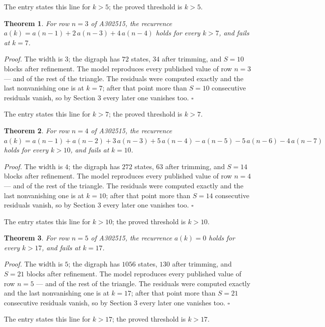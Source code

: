 \documentclass[11pt]{article}
\newtheorem{theorem}{Theorem}
\theoremstyle{definition}
\begin{document}
The entry states this line for $k > 5$; the proved threshold is $k > 5$.

\begin{theorem} For row $n = 3$ of A302515, the recurrence $a(k) = a(n-1) + 2\,a(n-3) + 4\,a(n-4)$ holds for every $k > 7$, and fails at $k = 7$.\end{theorem}

{\itshape Proof.} The width is $3$; the digraph has $72$ states, $34$ after trimming, and $S = 10$ blocks after refinement. The model reproduces every published value of row $n = 3$ --- and of the rest of the triangle. The residuals were computed exactly and the last nonvanishing one is at $k = 7$; after that point more than $S = 10$ consecutive residuals vanish, so by Section 3 every later one vanishes too. $\square$

The entry states this line for $k > 7$; the proved threshold is $k > 7$.

\begin{theorem} For row $n = 4$ of A302515, the recurrence $a(k) = a(n-1) + a(n-2) + 3\,a(n-3) + 5\,a(n-4) - a(n-5) - 5\,a(n-6) - 4\,a(n-7)$ holds for every $k > 10$, and fails at $k = 10$.\end{theorem}

{\itshape Proof.} The width is $4$; the digraph has $272$ states, $63$ after trimming, and $S = 14$ blocks after refinement. The model reproduces every published value of row $n = 4$ --- and of the rest of the triangle. The residuals were computed exactly and the last nonvanishing one is at $k = 10$; after that point more than $S = 14$ consecutive residuals vanish, so by Section 3 every later one vanishes too. $\square$

The entry states this line for $k > 10$; the proved threshold is $k > 10$.

\begin{theorem} For row $n = 5$ of A302515, the recurrence $a(k) = 0$ holds for every $k > 17$, and fails at $k = 17$.\end{theorem}

{\itshape Proof.} The width is $5$; the digraph has $1056$ states, $130$ after trimming, and $S = 21$ blocks after refinement. The model reproduces every published value of row $n = 5$ --- and of the rest of the triangle. The residuals were computed exactly and the last nonvanishing one is at $k = 17$; after that point more than $S = 21$ consecutive residuals vanish, so by Section 3 every later one vanishes too. $\square$

The entry states this line for $k > 17$; the proved threshold is $k > 17$.
\end{document}
